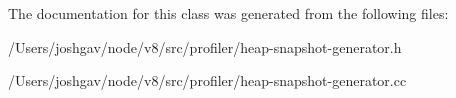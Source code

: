 The documentation for this class was generated from the following files\+:\begin{DoxyCompactItemize}
\item 
/\+Users/joshgav/node/v8/src/profiler/heap-\/snapshot-\/generator.\+h\item 
/\+Users/joshgav/node/v8/src/profiler/heap-\/snapshot-\/generator.\+cc\end{DoxyCompactItemize}
